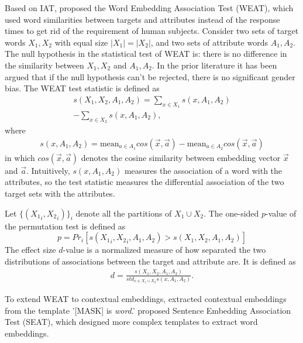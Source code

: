 Based on IAT, \cite{caliskan2017semantics} proposed the Word Embedding Association Test (WEAT), which used word similarities between targets and attributes instead of the response times to get rid of the requirement of human subjects. Consider two sets of target words $X_1,X_2$ with equal size $|X_1|=|X_2|$, and two sets of attribute words $A_1,A_2$. The null hypothesis in the statistical test of WEAT is: there is no difference in the similarity between $X_1,X_2$ and $A_1,A_2$. In the prior literature it has been argued that if the null hypothesis can't be rejected, there is no significant gender bias. 
  
The WEAT test statistic is defined as
\begin{eqnarray}
s(X_1,X_2,A_1,A_2)=\sum_{x\in X_1}s(x,A_1,A_2)\nonumber\\
-\sum_{x\in X_2}s(x,A_1,A_2),\nonumber
\end{eqnarray}
where
\begin{eqnarray}
s(x,A_1,A_2)=\mbox{mean}_{a\in A_1}cos(\vec{x},\vec{a})-\mbox{mean}_{a\in A_2}cos(\vec{x},\vec{a})\nonumber
\end{eqnarray}
in which $cos(\vec{x},\vec{a})$ denotes the cosine similarity between embedding vector $\vec{x}$ and $\vec{a}$. Intuitively, $s(x,A_1,A_2)$ measures the association of a word with the attributes, so the test statistic measures the differential association of the two target sets with the attributes. 

Let $\{({X_1}_i,{X_2}_i)\}_{i}$ denote all the partitions of $X_1\cup X_2$. The one-sided $p$-value of the permutation test is defined as $$p=Pr_i[s({X_1}_i,{X_2}_i,A_1,A_2)>s(X_1,X_2,A_1,A_2)]$$
The effect size $d$-value is a normalized measure of how separated the two distributions of associations between the target and attribute are. It is defined as
\begin{eqnarray}
d=\frac{s(X_1,X_2,A_1,A_2)}{std_{x\in X_1 \cup X_2}s(x,A_1,A_2)}.\nonumber
\end{eqnarray}

To extend WEAT to contextual embeddings, \cite{karve2019conceptor} extracted contextual embeddings from the template '[MASK] is \textit{word}.' \cite{may2019measuring} proposed Sentence Embedding Association Test (SEAT), which designed more complex templates to extract word embeddings. 


